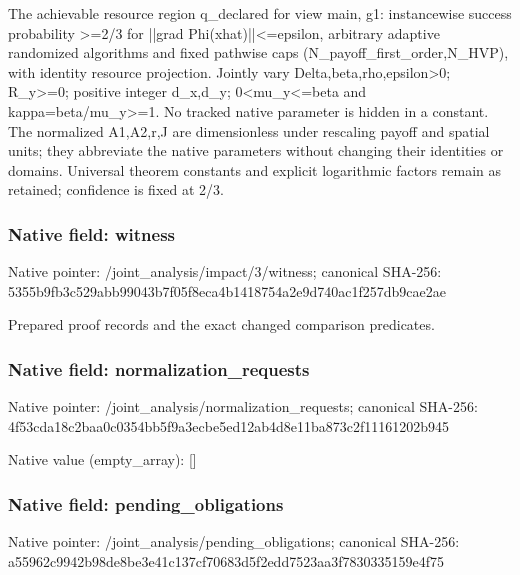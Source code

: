 \documentclass[10pt,a4paper]{article}
\begin{document}
\begingroup\raggedright\sloppy The achievable resource region q\_\allowbreak{}declared for view main,\allowbreak{} g1:\allowbreak{} instancewise success probability >=\allowbreak{}2/\allowbreak{}3 for ||grad Phi(xhat)||<=\allowbreak{}epsilon,\allowbreak{} arbitrary adaptive randomized algorithms and fixed pathwise caps (N\_\allowbreak{}payoff\_\allowbreak{}first\_\allowbreak{}order,\allowbreak{}N\_\allowbreak{}HVP),\allowbreak{} with identity resource projection. Jointly vary Delta,\allowbreak{}beta,\allowbreak{}rho,\allowbreak{}epsilon>0;\allowbreak{} R\_\allowbreak{}y>=\allowbreak{}0;\allowbreak{} positive integer d\_\allowbreak{}x,\allowbreak{}d\_\allowbreak{}y;\allowbreak{} 0<mu\_\allowbreak{}y<=\allowbreak{}beta and kappa=\allowbreak{}beta/\allowbreak{}mu\_\allowbreak{}y>=\allowbreak{}1. No tracked native parameter is hidden in a constant. The normalized A1,\allowbreak{}A2,\allowbreak{}r,\allowbreak{}J are dimensionless under rescaling payoff and spatial units;\allowbreak{} they abbreviate the native parameters without changing their identities or domains. Universal theorem constants and explicit logarithmic factors remain as retained;\allowbreak{} confidence is fixed at 2/\allowbreak{}3.\par\endgroup

\subsubsection{Native field: witness}
Native pointer: /joint\_\allowbreak{}analysis/impact/3/witness; canonical SHA-256: 5355b9fb3c529abb99043b7f05f8eca4b1418754a2e9d740ac1f257db9cae2ae

\begingroup\raggedright\sloppy Prepared proof records and the exact changed comparison predicates.\par\endgroup

\subsubsection{Native field: normalization\_\allowbreak{}requests}
Native pointer: /joint\_\allowbreak{}analysis/normalization\_\allowbreak{}requests; canonical SHA-256: 4f53cda18c2baa0c0354bb5f9a3ecbe5ed12ab4d8e11ba873c2f11161202b945

Native value (empty\_\allowbreak{}array): []

\subsubsection{Native field: pending\_\allowbreak{}obligations}
Native pointer: /joint\_\allowbreak{}analysis/pending\_\allowbreak{}obligations; canonical SHA-256: a55962c9942b98de8be3e41c137cf70683d5f2edd7523aa3f7830335159e4f75
\end{document}
